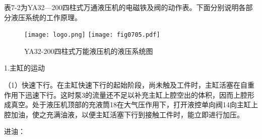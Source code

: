 表7-2为YA32—200四柱式万通液压机的电磁铁及阀的动作表。下面分别说明各部分液压系统的工作原理。

\begin{figure}
    \centering
    \ifOpenSource
    \texttt{[image: logo.png]}
    \else
    \texttt{[image: fig0705.pdf]}%
    \fi
    \caption{YA32-200四柱式万能液压机的液压系统图}
    \label{fig:fig0705}%
\end{figure}

1.主缸的运动

（1）快速下行。在主缸快速下行的起始阶段，尚未触及工件时，主缸活塞在自重作用下迅速下行。这时泵3的流量还不足以补充主缸上腔空出的体积，因而上腔形成真空。处于液压机顶部的充液筒18在大气压作用下，打开液控单向阀14向主缸上腔加油，使之充满油液，以便主缸活塞下行到接触工件时，能立即进行加压。

进油：